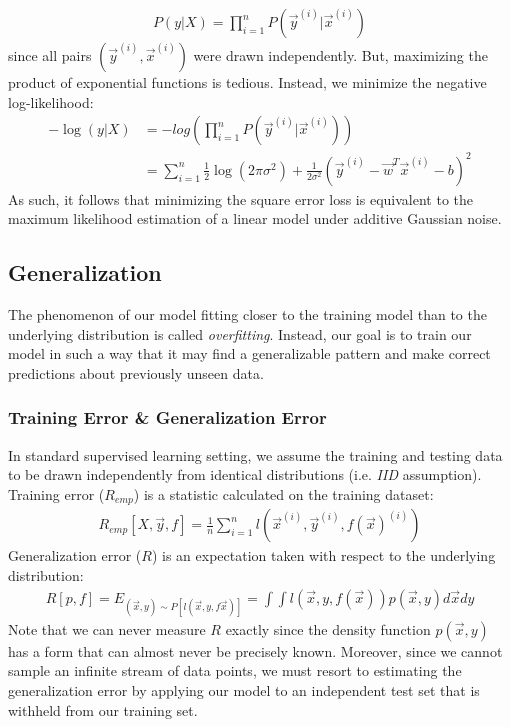 \documentclass[a4paper,12pt]{article}
\theoremstyle{definition}
\begin{document}
    \begin{equation*}
        \begin{aligned}
            P(y|X) = \prod_{i=1}^{n}P(\vec{y}^{(i)}|\vec{x}^{(i)})
        \end{aligned}
    \end{equation*}
    since all pairs $(\vec{y}^{(i)},\vec{x}^{(i)})$ were drawn independently. But, maximizing the product of exponential
    functions is tedious. Instead, we minimize the negative log-likelihood:
    \begin{equation*}
        \begin{aligned}
            -\log(y|X) &= -log(\prod_{i=1}^{n}P(\vec{y}^{(i)}|\vec{x}^{(i)})) \\
                       &= \sum_{i=1}^{n} \frac{1}{2}\log(2\pi\sigma^2) + \frac{1}{2\sigma^2}(\vec{y}^{(i)}-\vec{w}^T\vec{x}^{(i)} - b)^2
        \end{aligned}
    \end{equation*}
    As such, it follows that minimizing the square error loss is equivalent to the maximum likelihood estimation of a linear model 
    under additive Gaussian noise.

\subsection*{Generalization}
    The phenomenon of our model fitting closer to the training model than to the underlying distribution is called \textit{overfitting}.
    Instead, our goal is to train our model in such a way that it may find a generalizable pattern and make correct
    predictions about previously unseen data.
    \subsubsection*{Training Error \& Generalization Error}
    In standard supervised learning setting, we assume the training and testing data to be drawn independently from
    identical distributions (i.e. \textit{IID} assumption).
    Training error ($R_{emp}$) is a statistic calculated on the training dataset:
    \begin{equation*}
        \begin{aligned}
           R_{emp}[X,\vec{y},f] = \frac{1}{n}\sum_{i=1}^{n}l(\vec{x}^{(i)},\vec{y}^{(i)},f(\vec{x})^{(i)})
        \end{aligned}
    \end{equation*}
    Generalization error ($R$) is an expectation taken with respect to the underlying distribution:
    \begin{equation*}
        \begin{aligned}
           R[p,f] = E_{(\vec{x},y)\sim P[l(\vec{x},y,f{\vec{x}})]} = \int\int l(\vec{x},y,f(\vec{x}))p(\vec{x},y)d\vec{x}dy
         \end{aligned}
    \end{equation*}
    Note that we can never measure $R$ exactly since the density function $p(\vec{x},y)$ has a form that can almost never
    be precisely known. Moreover, since we cannot sample an infinite stream of data points, we must resort to estimating
    the generalization error by applying our model to an independent test set that is withheld from our training set.
\end{document}
